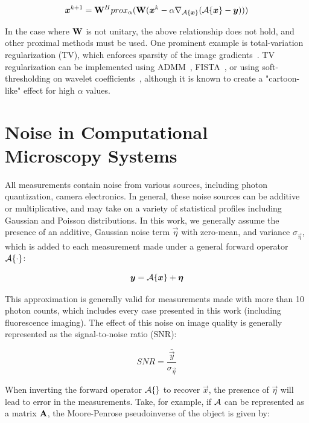 \begin{equation}
    \bm{x}^{k+1} = \mathbf{W}^H prox_{\alpha}(\mathbf{W} (\bm{x}^{k} - \alpha \nabla_{\mathcal{A}\{\bm{x}\}} (\mathcal{A}\{\bm{x}\} - \bm{y})))
\end{equation}

In the case where $\mathbf{W}$ is not unitary, the above relationship does not hold, and other proximal methods must be used. One prominent example is total-variation regularization (TV), which enforces sparsity of the image gradients~\cite{rudin1992nonlinear}. TV regularization can be implemented using ADMM~\cite{wahlberg2012admm}, FISTA~\cite{beck2009fast}, or using soft-thresholding on wavelet coefficients~\cite{kamilov2012wavelet}, although it is known to create a "cartoon-like" effect for high $\alpha$ values.

\section{Noise in Computational Microscopy Systems}\label{sec:intro_noise}
All measurements contain noise from various sources, including photon quantization, camera electronics. In general, these noise sources can be additive or multiplicative, and may take on a variety of statistical profiles including Gaussian and Poisson distributions. In this work, we generally assume the presence of an additive, Gaussian noise term $\vec{\eta}$ with zero-mean, and variance $\sigma_{\vec{\eta}}$, which is added to each measurement made under a general forward operator $\mathcal{A}\{\cdot\}$:

\begin{equation}\label{eq:intro_forward_model}
    \bm{y} = \mathcal{A}\{\bm{x}\} + \bm{\eta}
\end{equation}

This approximation is generally valid for measurements made with more than 10 photon counts, which includes every case presented in this work (including fluorescence imaging). The effect of this noise on image quality is generally represented as the signal-to-noise ratio (SNR):

\begin{equation}
    \label{eq:intro_snr}
    SNR = \frac{\bar{\vec{y}}}{\sigma_{\vec{\eta}}}
\end{equation}

When inverting the forward operator $\mathcal{A}\{\}$ to recover $\vec{x}$, the presence of $\vec{\eta}$ will lead to error in the measurements. Take, for example, if $\mathcal{A}$ can be represented as a matrix $\mathbf{A}$, the Moore-Penrose pseudoinverse of the object is given by:

